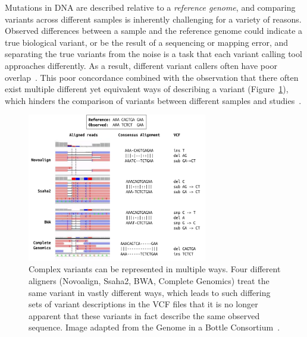 \begin{justify}
Mutations in DNA are described relative to a \emph{reference genome}, and comparing variants across different samples is inherently challenging for a variety of reasons. Observed differences between a sample and the reference genome could indicate a true biological variant, or be the result of a sequencing or mapping error, and separating the true variants from the noise is a task that each variant calling tool approaches differently. As a result, different variant callers often have poor overlap~\cite{orawe2013, hwang2015systematic}. This poor concordance combined with the observation that there often exist multiple different yet equivalent ways of describing a variant (Figure~\ref{fig:variant-multiple-representations}), which hinders the comparison of variants between different samples and studies~\cite{zook2014integrating}.

\begin{figure}[h!]
    \centering
    \includegraphics[width=0.7\textwidth]{chapters/images/variant-representation-all.png}

    \caption{Complex variants can be represented in multiple ways. Four different aligners (Novoalign, Ssaha2, BWA, Complete Genomics) treat the same variant in vastly different ways, which leads to such differing sets of variant descriptions in the VCF files that it is no longer apparent that these variants in fact describe the same observed sequence. Image adapted from the Genome in a Bottle Consortium~\cite{zook2014integrating}.}
    \label{fig:variant-multiple-representations}
\end{figure}



\end{justify}
